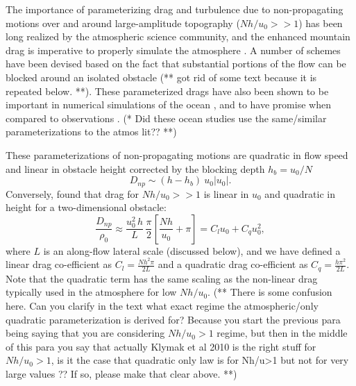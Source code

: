 \documentclass[twocol]{ametsocV5}
\begin{document}
The importance of parameterizing drag and turbulence due to non-propagating motions over and around large-amplitude topography ($Nh/u_0 >> 1$) has been long realized by the atmospheric science community, and the enhanced mountain drag is imperative to properly simulate the atmosphere \citep[i.e.][]{bacmeisterpierrhumbert88,LottMiller97}.  A number of schemes have been devised based on the fact that substantial portions of the flow can be blocked around an isolated obstacle \citep[i.e.][]{ScinoccaMcFarlane00, Garner05} (** got rid of some text because it is repeated below. **). These parameterized drags have also been shown to be important in numerical simulations of the ocean \citep{trossmanetal13,trossmanetal2016}, and to have promise when compared to observations \citep{TrossmanEtAl15}.  (* Did these ocean studies use the same/similar parameterizations to the atmos lit?? **)

These parameterizations of non-propagating motions are quadratic in flow speed and linear in obstacle height corrected by the blocking depth $h_b = u_0/N$
\begin{equation}
    D_{np} \sim (h-h_b)\ u_0 \left|u_0\right|.
\end{equation}
Conversely, \citep{klymaketal10a} found that drag for $Nh/u_0 >> 1$ is linear in $u_0$ and quadratic in height for a two-dimensional obstacle:  
\begin{equation}
    \frac{D_{np}}{\rho_0} \approx \frac{u_0^2\, h}{L}\, \frac{\pi}{2}\left[\frac{N h}{u_0}+ \pi\right] = C_l u_0 + C_q u_0^2,
    \label{eq:FormDragParam}
\end{equation}
where $L$ is an along-flow lateral scale (discussed below), and we have defined a linear drag co-efficient as $C_l = \frac{N h^2\pi}{2L}$ and a quadratic drag co-efficient as $C_q = \frac{h\pi^2}{2L}$.  Note that the quadratic  term has the same scaling as the non-linear drag typically used in the atmosphere for low $Nh/u_0$.   (** There is some confusion here. Can you clarify in the text what exact regime the atmospheric/only quadratic parameterization is derived for? Because you start the previous para being saying that you are considering $Nh/u_0>1$ regime, but then in the middle of this para you say that actually Klymak et al 2010 is the right stuff for $Nh/u_0>1$, is it the case that quadratic only law is for Nh/u>1 but not for very large values ?? If so, please make that clear above. **)
\end{document}
